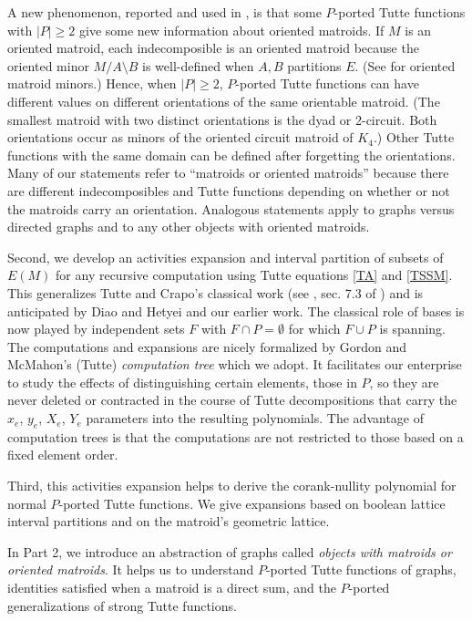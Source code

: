 \documentclass[12pt,leqno]{amsart}
\theoremstyle{remark}
\newcommand{\Card}[1]{\ensuremath{{\left|#1\right|}}}
\begin{document}
A new phenomenon, reported and used in \cite{TutteEx}, is that 
some $P$-ported Tutte functions with $\Card{P}\geq 2$
give some new information about oriented matroids.
If $M$ is an oriented
matroid, each indecomposible is an oriented
matroid because the oriented minor $M/A\setminus B$
is well-defined when $A,B$ partitions $E$. (See \cite{OMBOOK}
for oriented matroid minors.)
Hence, when $\Card{P}\geq 2$, $P$-ported Tutte functions
can have different values on different orientations of the
same orientable matroid.  (The smallest matroid with
two distinct orientations is the dyad or 2-circuit.  Both
orientations occur as minors of the oriented circuit
matroid of $K_4$.)
Other Tutte functions with the same domain can be defined after
forgetting the orientations.
Many of our statements refer to ``matroids or
oriented matroids'' because there are different indecomposibles
and Tutte functions depending on whether or 
not the matroids carry an orientation.  Analogous
statements apply to graphs versus directed graphs
and to any other objects with oriented matroids.

Second, we
develop an activities expansion 
and interval partition of subsets of $E(M)$ 
for any recursive
computation using Tutte equations \eqref{TA}
and \eqref{TSSM}.
This generalizes Tutte and Crapo's
classical work 
(see \cite{TutteDich,CrapoTP}, sec. 7.3 of \cite{BjornerChap}) 
and is anticipated
by Diao and Hetyei \cite{RelTuttePoly} and our 
earlier work\cite{TutteEx}.
The classical role of bases is now played by
independent sets $F$ with $F\cap P=\emptyset$
for which $F\cup P$ is spanning.
The computations and expansions are nicely
formalized by Gordon and McMahon's (Tutte)
\emph{computation tree}\cite{GordonMcMachonGreedoid} which we
adopt.   It facilitates our enterprise
to study the effects of distinguishing
certain elements, those in $P$, so they are never deleted or 
contracted in the course of Tutte decompositions
that carry the $x_e$, $y_e$, $X_e$, $Y_e$ parameters
into the resulting polynomials.  The advantage of computation
trees is that the computations are not restricted to those
based on a fixed element order.

Third, this activities expansion helps to 
derive the 
corank-nullity polynomial for normal
$P$-ported Tutte functions.
We give expansions based on boolean lattice interval partitions
and on the matroid's geometric lattice.

In Part 2, we introduce an abstraction of graphs called
\emph{objects with matroids or oriented matroids}.
It helps us to understand $P$-ported Tutte functions
of graphs, identities satisfied 
when a matroid is a direct sum, and the 
$P$-ported generalizations of
strong Tutte functions.  
\end{document}
